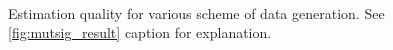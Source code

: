 \begin{figure}[]
  \centering
  \\
  \caption{Estimation quality for various scheme of data generation. See \cref{fig:mutsig_result} caption for explanation.}
  \label{fig:mutsig_result_appendix_1}
\end{figure}

